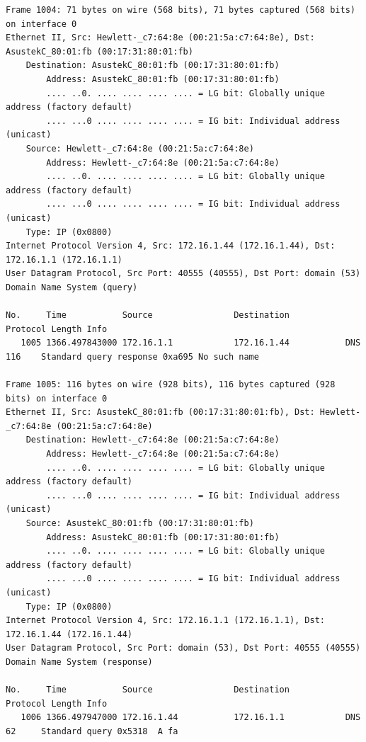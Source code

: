 \documentclass[a4paper,11pt]{article}
\begin{document}
\begin{lstlisting}
Frame 1004: 71 bytes on wire (568 bits), 71 bytes captured (568 bits) on interface 0
Ethernet II, Src: Hewlett-_c7:64:8e (00:21:5a:c7:64:8e), Dst: AsustekC_80:01:fb (00:17:31:80:01:fb)
    Destination: AsustekC_80:01:fb (00:17:31:80:01:fb)
        Address: AsustekC_80:01:fb (00:17:31:80:01:fb)
        .... ..0. .... .... .... .... = LG bit: Globally unique address (factory default)
        .... ...0 .... .... .... .... = IG bit: Individual address (unicast)
    Source: Hewlett-_c7:64:8e (00:21:5a:c7:64:8e)
        Address: Hewlett-_c7:64:8e (00:21:5a:c7:64:8e)
        .... ..0. .... .... .... .... = LG bit: Globally unique address (factory default)
        .... ...0 .... .... .... .... = IG bit: Individual address (unicast)
    Type: IP (0x0800)
Internet Protocol Version 4, Src: 172.16.1.44 (172.16.1.44), Dst: 172.16.1.1 (172.16.1.1)
User Datagram Protocol, Src Port: 40555 (40555), Dst Port: domain (53)
Domain Name System (query)

No.     Time           Source                Destination           Protocol Length Info
   1005 1366.497843000 172.16.1.1            172.16.1.44           DNS      116    Standard query response 0xa695 No such name

Frame 1005: 116 bytes on wire (928 bits), 116 bytes captured (928 bits) on interface 0
Ethernet II, Src: AsustekC_80:01:fb (00:17:31:80:01:fb), Dst: Hewlett-_c7:64:8e (00:21:5a:c7:64:8e)
    Destination: Hewlett-_c7:64:8e (00:21:5a:c7:64:8e)
        Address: Hewlett-_c7:64:8e (00:21:5a:c7:64:8e)
        .... ..0. .... .... .... .... = LG bit: Globally unique address (factory default)
        .... ...0 .... .... .... .... = IG bit: Individual address (unicast)
    Source: AsustekC_80:01:fb (00:17:31:80:01:fb)
        Address: AsustekC_80:01:fb (00:17:31:80:01:fb)
        .... ..0. .... .... .... .... = LG bit: Globally unique address (factory default)
        .... ...0 .... .... .... .... = IG bit: Individual address (unicast)
    Type: IP (0x0800)
Internet Protocol Version 4, Src: 172.16.1.1 (172.16.1.1), Dst: 172.16.1.44 (172.16.1.44)
User Datagram Protocol, Src Port: domain (53), Dst Port: 40555 (40555)
Domain Name System (response)

No.     Time           Source                Destination           Protocol Length Info
   1006 1366.497947000 172.16.1.44           172.16.1.1            DNS      62     Standard query 0x5318  A fa


\end{lstlisting}
\end{document}
